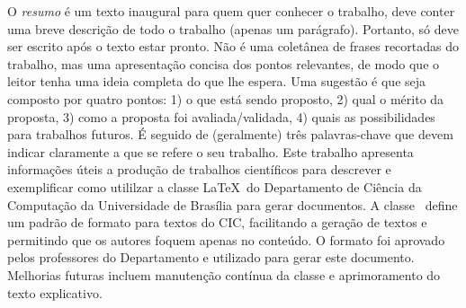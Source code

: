 O \emph{resumo} é um texto inaugural para quem quer conhecer o trabalho, deve conter 
uma breve descrição de todo o trabalho (apenas um parágrafo). Portanto, só deve 
ser escrito após o texto estar pronto. Não é uma coletânea de frases recortadas 
do trabalho, mas uma apresentação concisa dos pontos relevantes, de modo que o
leitor tenha uma ideia completa do que lhe espera. Uma sugestão é que seja composto
por quatro pontos: 1) o que está sendo proposto, 2) qual o mérito da proposta, 3)
como a proposta foi avaliada/validada, 4) quais as possibilidades para trabalhos
futuros. É seguido de (geralmente) três palavras-chave que devem indicar claramente a que se 
refere o seu trabalho. Este trabalho apresenta informações úteis a produção de trabalhos 
científicos para descrever e exemplificar como utililzar a classe \LaTeX\ do 
Departamento de Ciência da Computação da Universidade de Brasília para gerar 
documentos. A classe \unbcic\ define um padrão de formato para textos do CIC, facilitando a
geração de textos e permitindo que os autores foquem apenas no conteúdo. O formato
foi aprovado pelos professores do Departamento e utilizado para gerar este documento.
Melhorias futuras incluem manutenção contínua da classe e aprimoramento do texto
explicativo.